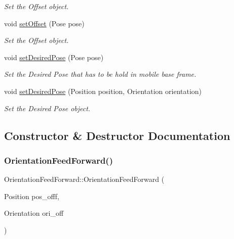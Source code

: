 \begin{DoxyCompactItemize}
\begin{DoxyCompactList}\small\item\em Set the Offset object. \end{DoxyCompactList}\item 
void \hyperlink{classOrientationFeedForward_adbd1691b1e930752818624d065acbf1c}{set\+Offset} (Pose pose)
\begin{DoxyCompactList}\small\item\em Set the Offset object. \end{DoxyCompactList}\item 
void \hyperlink{classOrientationFeedForward_a5f69dfd449972707d2ccd07e20fd2c5b}{set\+Desired\+Pose} (Pose pose)
\begin{DoxyCompactList}\small\item\em Set the Desired Pose that has to be hold in mobile base frame. \end{DoxyCompactList}\item 
void \hyperlink{classOrientationFeedForward_ad419aebf0df88282ca6c1dc24adbadb2}{set\+Desired\+Pose} (Position position, Orientation orientation)
\begin{DoxyCompactList}\small\item\em Set the Desired Pose object. \end{DoxyCompactList}\end{DoxyCompactItemize}


\subsection{Constructor \& Destructor Documentation}
\mbox{\label{classOrientationFeedForward_a0ae1aba3b3e0abf84828a9db008b6f69}} 
\subsubsection{\texorpdfstring{Orientation\+Feed\+Forward()}{OrientationFeedForward()}}
{\footnotesize\ttfamily Orientation\+Feed\+Forward\+::\+Orientation\+Feed\+Forward (\begin{DoxyParamCaption}\item[{Position}]{pos\+\_\+offf,  }\item[{Orientation}]{ori\+\_\+off }\end{DoxyParamCaption})}



